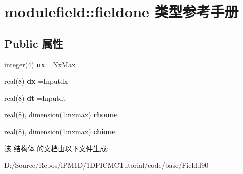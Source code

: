 \hypertarget{structmodulefield_1_1fieldone}{}\section{modulefield\+::fieldone 类型参考手册}
\label{structmodulefield_1_1fieldone}
\subsection*{Public 属性}
\begin{DoxyCompactItemize}
\item 
\mbox{\label{structmodulefield_1_1fieldone_a5273ef074bf0dbcc5133e099f80ba36d}} 
integer(4) {\bfseries nx} =Nx\+Max
\item 
\mbox{\label{structmodulefield_1_1fieldone_a868f04f3c7fb18defa4620426c776b05}} 
real(8) {\bfseries dx} =Inputdx
\item 
\mbox{\label{structmodulefield_1_1fieldone_a2e667959e94474cfe744d52173555de9}} 
real(8) {\bfseries dt} =Inputdt
\item 
\mbox{\label{structmodulefield_1_1fieldone_a3f42b136ee496d33772d89e9b23b9749}} 
real(8), dimension(1\+:nxmax) {\bfseries rhoone}
\item 
\mbox{\label{structmodulefield_1_1fieldone_a45aef3d4694f622c4495c9624f5fee01}} 
real(8), dimension(1\+:nxmax) {\bfseries chione}
\end{DoxyCompactItemize}


该 结构体 的文档由以下文件生成\+:\begin{DoxyCompactItemize}
\item 
D\+:/\+Source/\+Repos/i\+P\+M1\+D/1\+D\+P\+I\+C\+M\+C\+Tutorial/code/base/Field.\+f90\end{DoxyCompactItemize}

